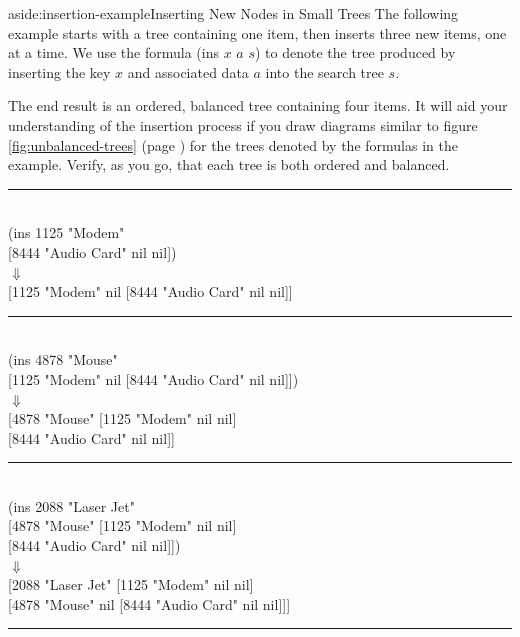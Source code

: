 \begin{aside}{aside:insertion-example}{Inserting New Nodes in Small Trees}
The following example starts with a tree containing one item,
then inserts three new items, one at a time.
We use the formula \textsf{(ins $x$ $a$ $s$)} to denote
the tree produced by inserting the key $x$ and associated
data $a$ into the search tree $s$.

The end result is an ordered,
balanced tree containing four items.
It will aid your understanding
of the insertion process if you draw diagrams similar to figure
\ref{fig:unbalanced-trees} (page \pageref{fig:unbalanced-trees}) 
for the trees denoted by the formulas in the example.
Verify, as you go, that each tree is both ordered and balanced.
\begin{center}
\begin{tabbing}
%
\vspace*{-1.5\topsep}
\rule{\textwidth}{0.5pt}
\vspace*{-\topsep}
%
\\
\textsf{(ins} \= \textsf{1125 "Modem" }\\
     \> \textsf{{[}8444 "Audio Card" nil nil{]})} \\
     \> $\Downarrow$ \\
\textsf{{[}1125 "Modem" nil {[}8444 "Audio Card" nil nil{]}{]}} \\
%
\vspace*{-1.5\topsep}
\rule{\textwidth}{0.5pt}%
\vspace*{-\topsep}
%
\\
\textsf{(ins} \= \textsf{4878 "Mouse"} \\
     \> \textsf{{[}1125 "Modem" nil {[}8444 "Audio Card" nil nil{]}{]})} \\
     \> $\Downarrow$ \\
\textsf{{[}4878 "Mouse"} \= \textsf{{[}1125 "Modem"      nil nil{]}}  \\
              \> \textsf{{[}8444 "Audio Card" nil nil{]}{]}} \\
%
\vspace*{-1.5\topsep}
\rule{\textwidth}{0.5pt}%
\vspace*{-\topsep}
%
\\
\textsf{(ins} \= \textsf{2088 "Laser Jet"} \\
     \> \textsf{{[}4878 "Mouse"} \= \textsf{{[}1125 "Modem" nil nil{]}} \\
     \>               \> \textsf{{[}8444 "Audio Card" nil nil{]}{]})} \\
     \> $\Downarrow$ \\
\textsf{{[}2088 "Laser Jet"} \= \textsf{{[}1125 "Modem" nil nil{]}} \\
                  \> \textsf{{[}4878 "Mouse" nil {[}8444 "Audio Card" nil nil{]}{]}{]}} \\
%
\vspace*{-1.5\topsep}
\rule{\textwidth}{0.5pt}%
\vspace*{-\topsep}
%
\end{tabbing}
\end{center}
\end{aside}

